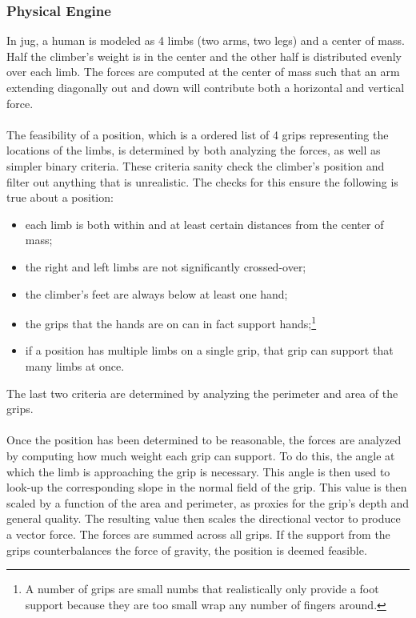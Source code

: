 \documentclass[pdftex,12pt]{article}
\theoremstyle{definition}
\theoremstyle{remark}
\begin{document}
\subsubsection*{Physical Engine}
In jug, a human is modeled as 4 limbs (two arms, two legs) and a center of mass. Half the climber's weight is in the center and the other half is distributed evenly over each limb. The forces are computed at the center of mass such that an arm extending diagonally out and down will contribute both a horizontal and vertical force.\\ \\
The feasibility of a position, which is a ordered list of 4 grips representing the locations of the limbs, is determined by both analyzing the forces, as well as simpler binary criteria. These criteria sanity check the climber's position and filter out anything that is unrealistic. The checks for this ensure the following is true about a position:
\begin{itemize}
\setlength{\itemsep}{0pt}
\setlength{\parskip}{0pt}
 \item each limb is both within and at least certain distances from the center of mass;
 \item the right and left limbs are not significantly crossed-over;
 \item the climber's feet are always below at least one hand;
 \item the grips that the hands are on can in fact support hands;\footnote{A number of grips are small numbs that realistically only provide a foot support because they are too small wrap any number of fingers around.}
 \item if a position has multiple limbs on a single grip, that grip can support that many limbs at once.
\end{itemize}
The last two criteria are determined by analyzing the perimeter and area of the grips.\\ \\
Once the position has been determined to be reasonable, the forces are analyzed by computing how much weight each grip can support. To do this, the angle at which the limb is approaching the grip is necessary. This angle is then used to look-up the corresponding slope in the normal field of the grip. This value is then scaled by a function of the area and perimeter, as proxies for the grip's depth and general quality. The resulting value then scales the directional vector to produce a vector force. The forces are summed across all grips. If the support from the grips counterbalances the force of gravity, the position is deemed feasible.
\end{document}
